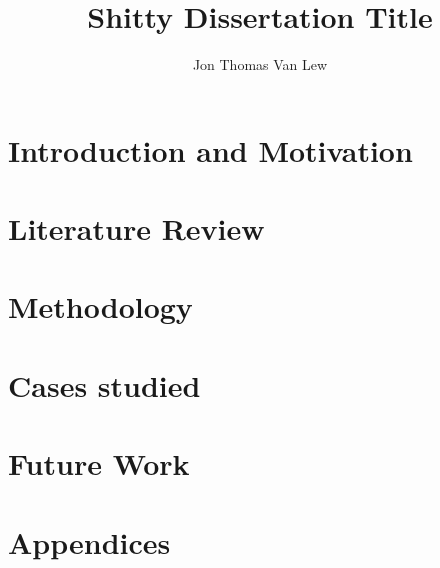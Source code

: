 \documentclass [PhD] {uclathes}
\title          {Shitty Dissertation Title}
\author         {Jon Thomas Van Lew}
\begin{document}
\makeintropages



%



\part{Introduction and Motivation}



\part{Literature Review}





\part{Methodology}




\part{Cases studied}





\part{Future Work}

\part{Appendices}
\appendix





\end{document}
